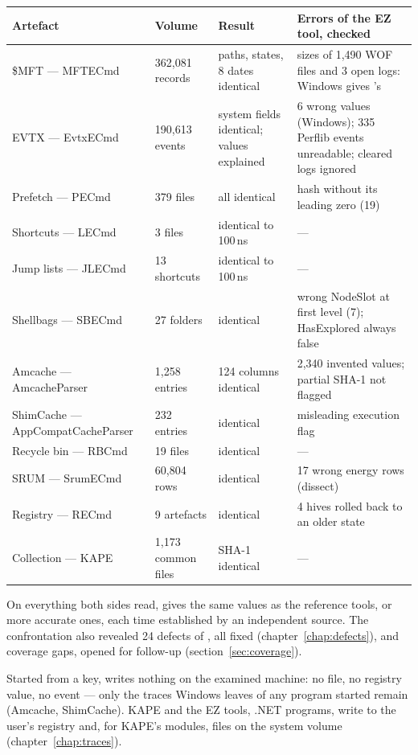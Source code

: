 \documentclass[11pt,a4paper,oneside]{report}
\begin{document}
\begin{longtable}{@{}L{3.2cm}L{2.4cm}L{4.5cm}L{5.0cm}@{}}
\toprule
\textbf{Artefact} & \textbf{Volume} & \textbf{Result} & \textbf{Errors of the EZ tool, checked} \\
\midrule\endhead
\$MFT --- MFTECmd & 362,081 records & paths, states, 8 dates identical & sizes of 1,490 WOF files and 3 open logs: Windows gives \wac{}'s \\
EVTX --- EvtxECmd & 190,613 events & system fields identical; values explained & 6 wrong values (Windows); 335 Perflib events unreadable; cleared logs ignored \\
Prefetch --- PECmd & 379 files & all identical & hash without its leading zero (19) \\
Shortcuts --- LECmd & 3 files & identical to 100\,ns & --- \\
Jump lists --- JLECmd & 13 shortcuts & identical to 100\,ns & --- \\
Shellbags --- SBECmd & 27 folders & identical & wrong NodeSlot at first level (7); HasExplored always false \\
Amcache --- AmcacheParser & 1,258 entries & 124 columns identical & 2,340 invented values; partial SHA-1 not flagged \\
ShimCache --- AppCompat\-Cache\-Parser & 232 entries & identical & misleading execution flag \\
Recycle bin --- RBCmd & 19 files & identical & --- \\
SRUM --- SrumECmd & 60,804 rows & identical & 17 wrong energy rows (dissect) \\
Registry --- RECmd & 9 artefacts & identical & 4 hives rolled back to an older state \\
Collection --- KAPE & 1,173 common files & SHA-1 identical & --- \\
\bottomrule
\end{longtable}

\begin{note}
On everything both sides read, \wac{} gives the same values as the reference
tools, or more accurate ones, each time established by an independent source.
The confrontation also revealed 24 defects of \wac{}, all fixed
(chapter~\ref{chap:defects}), and coverage gaps, opened for follow-up
(section~\ref{sec:coverage}).

Started from a key, \wac{} writes nothing on the examined machine: no file, no
registry value, no event --- only the traces Windows leaves of any program
started remain (Amcache, ShimCache). KAPE and the EZ tools, .NET programs,
write to the user's registry and, for KAPE's modules, files on the system
volume (chapter~\ref{chap:traces}).
\end{note}
\end{document}
